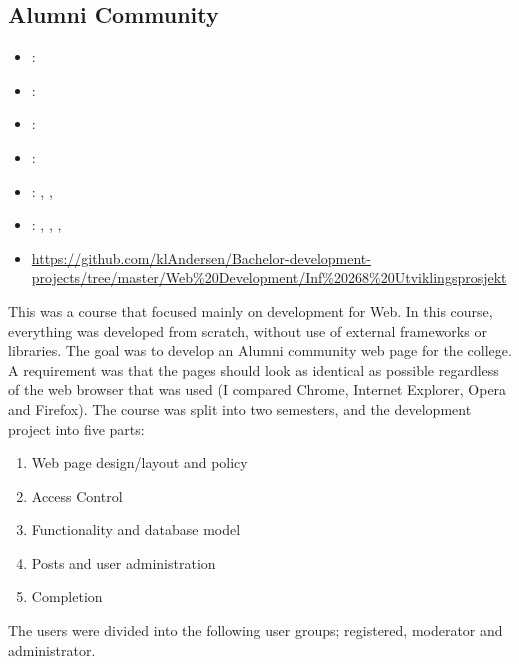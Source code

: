 \label{sec:section6}


\subsection{Alumni Community}
\label{sec:alumni}
\begin{itemize} 
	\item {}: 
	\item {}: 
	\item {}: 
	\item {}: 
	\item {}: , , 
	\item {}: , , , 
	\item {} \url{https://github.com/klAndersen/Bachelor-development-projects/tree/master/Web%20Development/Inf%20268%20Utviklingsprosjekt}
\end{itemize} 
This was a course that focused mainly on development for Web. 
In this course, everything was developed from scratch, without use of external frameworks or libraries. 
The goal was to develop an Alumni community web page for the college. 
A requirement was that the pages should look as identical as possible regardless of the web browser that was used 
(I compared Chrome, Internet Explorer, Opera and Firefox).
\vspace{0.5em}\newline
The course was split into two semesters, and the development project into five parts:
\begin{enumerate}
	\item Web page design/layout and policy
	\item Access Control
	\item Functionality and database model
	\item Posts and user administration
	\item Completion
\end{enumerate}
The users were divided into the following user groups; registered, moderator and administrator. 

